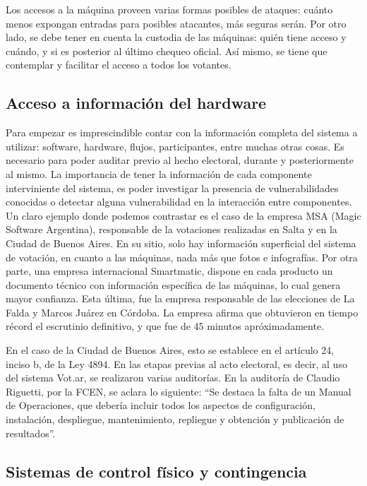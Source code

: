 Los accesos a la máquina proveen varias formas posibles de ataques: cuánto menos expongan entradas para posibles atacantes, más seguras serán. Por otro lado, se debe tener en cuenta la custodia de las máquinas: quién tiene acceso y cuándo, y si es posterior al último chequeo oficial. Así mismo, se tiene que contemplar y facilitar el acceso a todos los votantes.

\subsection{Acceso a información del hardware}

Para empezar es imprescindible contar con la información completa del sistema a utilizar: software, hardware, flujos, participantes, entre muchas otras cosas. Es necesario para poder auditar previo al hecho electoral, durante y posteriormente al mismo. La importancia de tener la información de cada componente interviniente del sistema, es poder investigar la presencia de vulnerabilidades conocidas o detectar alguna vulnerabilidad en la interacción entre componentes. Un claro ejemplo donde podemos contrastar es el caso de la empresa MSA (Magic Software Argentina), responsable de la votaciones realizadas en Salta y en la Ciudad de Buenos Aires. En su sitio, solo hay información superficial del sistema de votación, en cuanto a las máquinas, nada más que fotos e infografías. Por otra parte, una empresa internacional Smartmatic, dispone en cada producto un documento técnico con información específica de las máquinas\cite{smartmatic}, lo cual genera mayor confianza. Esta última, fue la empresa responsable de las elecciones de La Falda y Marcos Juárez en Córdoba. La empresa afirma que obtuvieron en tiempo récord el escrutinio definitivo, y que fue de 45 minutos apróximadamente\cite{smartmatic:cordoba}.

En el caso de la Ciudad de Buenos Aires, esto se establece en el artículo 24, inciso b, de la Ley 4894. En las etapas previas al acto electoral, es decir, al uso del sistema Vot.ar, se realizaron varias auditorías.
En la auditoría de Claudio Riguetti, por la FCEN, se aclara lo siguiente: “Se destaca la falta de un Manual de Operaciones, que debería incluir todos los aspectos de configuración, instalación, despliegue, mantenimiento, repliegue y obtención y publicación de resultados”\cite{righetti}.

\subsection{Sistemas de control físico y contingencia}


